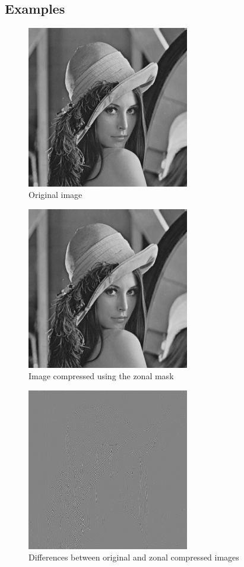 \documentclass[10pt]{article}
\begin{document}
\subsection{Examples}
\begin{figure}[!ht]
	\centering
	\includegraphics[height=200pt]{./ex7/lenna.jpg}
	\caption{Original image}
\end{figure}
\begin{figure}[!ht]
	\centering
	\includegraphics[height=200pt]{./ex7/zonal.jpg}
	\caption{Image compressed using the zonal mask}
\end{figure}
\clearpage
\begin{figure}[!ht]
	\centering
	\includegraphics[height=200pt]{./ex7/zonaldiff.jpg}
	\caption{Differences between original and zonal compressed images}
\end{figure}
\end{document}
